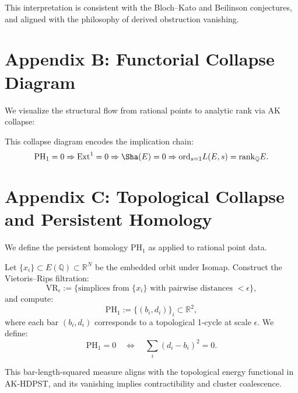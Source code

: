 This interpretation is consistent with the Bloch–Kato and Beilinson conjectures, and aligned with the philosophy of derived obstruction vanishing.


\section*{Appendix B: Functorial Collapse Diagram}

We visualize the structural flow from rational points to analytic rank via AK collapse:

\begin{center}
\end{center}

\medskip

This collapse diagram encodes the implication chain:
\[
\mathrm{PH}_1 = 0 \Rightarrow \mathrm{Ext}^1 = 0 \Rightarrow \Sha(E) = 0 \Rightarrow \mathrm{ord}_{s=1}L(E,s) = \mathrm{rank}_\mathbb{Q}E.
\]

\section*{Appendix C: Topological Collapse and Persistent Homology}

We define the persistent homology \( \mathrm{PH}_1 \) as applied to rational point data.

Let \( \{x_i\} \subset E(\mathbb{Q}) \subset \mathbb{R}^N \) be the embedded orbit under Isomap.  
Construct the Vietoris–Rips filtration:
\[
\mathrm{VR}_\epsilon := \{ \text{simplices from } \{x_i\} \text{ with pairwise distances } < \epsilon \},
\]
and compute:
\[
\mathrm{PH}_1 := \{ (b_i, d_i) \}_{i} \subset \mathbb{R}^2,
\]
where each bar \( (b_i, d_i) \) corresponds to a topological 1-cycle at scale \( \epsilon \).  
We define:
\[
\mathrm{PH}_1 = 0 \quad \Leftrightarrow \quad \sum_i (d_i - b_i)^2 = 0.
\]

This bar-length-squared measure aligns with the topological energy functional in AK-HDPST, and its vanishing implies contractibility and cluster coalescence.

